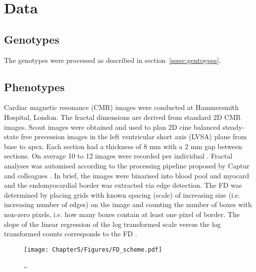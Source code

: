 \section{Data}
\subsection{Genotypes}

The genotypes were processed as described in section~\ref{sssec:gentoypes}. 


\subsection{Phenotypes}
Cardiac magnetic resonance (CMR) images were conducted at Hammersmith Hospital, London. The fractal dimensions are derived from standard 2D CMR images. Scout images were obtained and used to plan 2D cine balanced steady-state free precession images in the left ventricular short axis (LVSA) plane from base to apex. Each section had a thickness of 8 mm with a 2 mm gap between sections. On average 10 to 12 images were recorded per individual \citep{DeMarvao2014}. Fractal analyses was automised according to the processing pipeline proposed by Captur and colleagues \citeyearpar{Captur2013}. In brief, the images were binarised into blood pool and myocard and the endomyocardial border was extracted via edge detection. The FD was determined by placing grids with known spacing (scale) of increasing size (i.e. increasing number of edges) on the image and counting the number of boxes with non-zero pixels, i.e. how many boxes contain at least one pixel of border. The slope of the linear regression of the log transformed scale versus the log transformed counts corresponds to the FD \citep{Captur2013}.

\begin{figure}[hbtp]
	\centering
	\texttt{[image: Chapter5/Figures/FD\_scheme.pdf]}
	\caption{\textbf{.}.} 
	 	\label{fig:FD}
\end{figure}